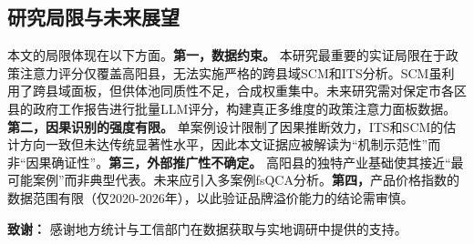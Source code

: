 \documentclass[12pt,a4paper]{ctexart}
\begin{document}
\subsection{研究局限与未来展望}
本文的局限体现在以下方面。\textbf{第一，数据约束。} 本研究最重要的实证局限在于政策注意力评分仅覆盖高阳县，无法实施严格的跨县域SCM和ITS分析。SCM虽利用了跨县域面板，但供体池同质性不足，合成权重集中。未来研究需对保定市各区县的政府工作报告进行批量LLM评分，构建真正多维度的政策注意力面板数据。\textbf{第二，因果识别的强度有限。} 单案例设计限制了因果推断效力，ITS和SCM的估计方向一致但未达传统显著性水平，因此本文证据应被解读为\textquotedblleft 机制示范性\textquotedblright 而非\textquotedblleft 因果确证性\textquotedblright。\textbf{第三，外部推广性不确定。} 高阳县的独特产业基础使其接近\textquotedblleft 最可能案例\textquotedblright 而非典型代表。未来应引入多案例fsQCA分析。\textbf{第四，}产品价格指数的数据范围有限（仅2020-2026年），以此验证品牌溢价能力的结论需审慎。

\vspace{1cm}
\noindent\textbf{致谢：} 感谢地方统计与工信部门在数据获取与实地调研中提供的支持。



\end{document}
